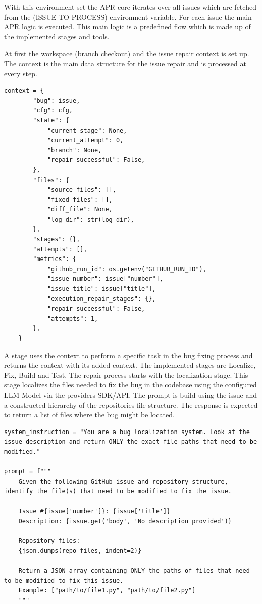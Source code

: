 With this environment set the APR core iterates over all issues which are fetched from the (ISSUE TO PROCESS) environment variable. For each issue the main APR logic is executed. This main logic is a predefined flow which is made up of the implemented stages and tools.

At first the workspace (branch checkout) and the issue repair context is set up. The context is the main data structure for the issue repair and is processed at every step.

\begin{lstlisting}[caption={Context JSON}]
context = {
        "bug": issue,
        "cfg": cfg,
        "state": {
            "current_stage": None,
            "current_attempt": 0,
            "branch": None,
            "repair_successful": False,
        },
        "files": {
            "source_files": [],
            "fixed_files": [],
            "diff_file": None,
            "log_dir": str(log_dir),
        },
        "stages": {},
        "attempts": [],
        "metrics": {
            "github_run_id": os.getenv("GITHUB_RUN_ID"),
            "issue_number": issue["number"],
            "issue_title": issue["title"],
            "execution_repair_stages": {},
            "repair_successful": False,
            "attempts": 1,
        },
    }
\end{lstlisting}

A stage uses the context to perform a specific task in the bug fixing process and returns the context with its added context. The implemented stages are Localize, Fix, Build and Test. The repair process starts with the localization stage. This stage localizes the files needed to fix the bug in the codebase using the configured LLM Model via the providers SDK/API. The prompt is build using the issue and a constructed hierarchy of the repositories file structure. The response is expected to return a list of files where the bug might be located.

\begin{lstlisting}[caption={Localization Prompt}]
system_instruction = "You are a bug localization system. Look at the issue description and return ONLY the exact file paths that need to be modified."

prompt = f"""
    Given the following GitHub issue and repository structure, identify the file(s) that need to be modified to fix the issue.

    Issue #{issue['number']}: {issue['title']}
    Description: {issue.get('body', 'No description provided')}

    Repository files:
    {json.dumps(repo_files, indent=2)}

    Return a JSON array containing ONLY the paths of files that need to be modified to fix this issue.
    Example: ["path/to/file1.py", "path/to/file2.py"]
    """
\end{lstlisting}

